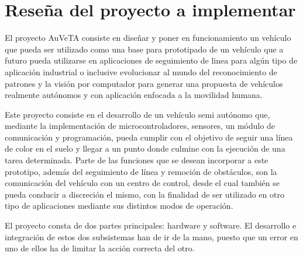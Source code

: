 \section{Reseña del proyecto a implementar}

El proyecto AuVeTA consiste en diseñar y poner en funcionamiento un vehículo que pueda ser utilizado como una base para prototipado de un vehículo que a futuro pueda utilizarse en aplicaciones de seguimiento de linea para algún tipo de aplicación industrial o inclusive evolucionar al mundo del reconocimiento de patrones y la visión por computador para generar una propuesta de vehículos realmente autónomos y con aplicación enfocada a la movilidad humana.

Este proyecto consiste en el desarrollo de un vehículo semi autónomo que, mediante la implementación de microcontroladores, sensores, un módulo de comunicación y programación, pueda cumplir con el objetivo de seguir una línea de color en el suelo y llegar a un punto donde culmine con la ejecución de una tarea determinada. Parte de las funciones que se desean incorporar a este prototipo, además del seguimiento de línea y remoción de obstáculos, son la comunicación del vehículo con un centro de control, desde el cual también se pueda conducir a discreción el mismo, con la finalidad de ser utilizado en otro tipo de aplicaciones mediante sus distintos modos de operación.

El proyecto consta de dos partes principales: hardware y software. El desarrollo e integración de estos dos subsistemas han de ir de la mano, puesto que un error en uno de ellos ha de limitar la acción correcta del otro.